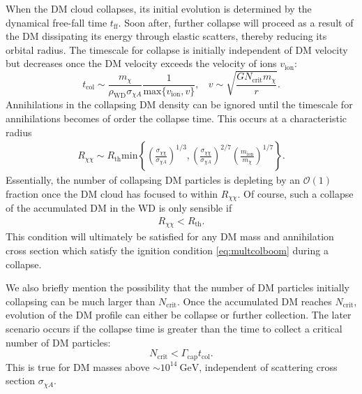 \documentclass[preprintnumbers,amsmath,amssymb,prd,superscriptaddress]{revtex4}
\newcommand{\OO}{\mathcal{O}}
\newcommand{\GeV}{\text{GeV}}
\def\r{\right)}
\def\l{\left(}
\begin{document}
When the DM cloud collapses, its initial evolution is determined by the dynamical free-fall time $t_\text{ff}$. 
Soon after, further collapse will proceed as a result of the DM dissipating its energy through elastic scatters, thereby reducing its orbital radius.
The timescale for collapse is initially independent of DM velocity but decreases once the DM velocity exceeds the velocity of ions $v_\text{ion}$:
\begin{equation}
t_\text{col} \sim \frac{m_\chi}{\rho_\text{WD} \sigma_{\chi A}} \frac{1}{\text{max}\{{v_\text{ion},v\}}}, ~~~~ v \sim \sqrt{\frac{G N_\text{crit} m_\chi}{r}}.
\end{equation}
Annihilations in the collapsing DM density can be ignored until the timescale for annihilations becomes of order the collapse time.
This occurs at a characteristic radius
\begin{align}
R_{\chi \chi} \sim R_\text{th}  \text{min} \left \{ \l \frac{\sigma_{\chi \chi}}{\sigma_{\chi A}}\r^{1/3}, \l \frac{\sigma_{\chi \chi}}{\sigma_{\chi A}}\r^{2/7} \l \frac{m_\text{ion}}{m_\chi} \r^{1/7} \right \}.
\end{align}
Essentially, the number of collapsing DM particles is depleting by an $\OO(1)$ fraction once the DM cloud has focused to within $R_{\chi \chi}$.
Of course, such a collapse of the accumulated DM in the WD is only sensible if
\begin{align}
\label{eq:xicondition}
R_{\chi \chi} < R_\text{th}.
\end{align}
This condition will ultimately be satisfied for any DM mass and annihilation cross section which satisfy the ignition condition \eqref{eq:multcolboom} during a collapse. 

We also briefly mention the possibility that the number of DM particles initially collapsing can be much larger than $N_\text{crit}$. 
Once the accumulated DM reaches $N_\text{crit}$, evolution of the DM profile can either be collapse or further collection.
The later scenario occurs if the collapse time is greater than the time to collect a critical number of DM particles:
\begin{equation}
N_\text{crit} < \Gamma_\text{cap} t_\text{col}.
\end{equation}
This is true for DM masses above $\sim 10^{14} ~\GeV$, independent of scattering cross section $\sigma_{\chi A}$. 
\end{document}
